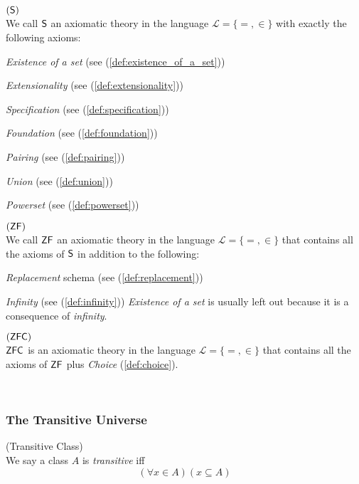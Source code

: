 \begin{definition}{$(\sf{S})$}\label{def:s}\\ %
We call $\sf{S}$ an axiomatic theory in the language $\mathscr{L} = \{=, \in\}$ with exactly the following axioms:
\bce[(i)]
\item \emph{Existence of a set} (see (\ref{def:existence_of_a_set}))
\item \emph{Extensionality} (see (\ref{def:extensionality}))
\item \emph{Specification} (see (\ref{def:specification}))
\item \emph{Foundation} (see (\ref{def:foundation}))
\item \emph{Pairing} (see (\ref{def:pairing}))
\item \emph{Union} (see (\ref{def:union}))
\item \emph{Powerset} (see (\ref{def:powerset}))
\ece
\end{definition}

\begin{definition}{$(\sf{ZF})$}\label{def:zf}\\ %
We call $\sf{ZF}$ an axiomatic theory in the language $\mathscr{L} = \{=, \in\}$ that contains all the axioms of $\sf{S}$ in addition to the following:
\bce[(i)]
\item \emph{Replacement} schema (see (\ref{def:replacement}))
\item \emph{Infinity} (see (\ref{def:infinity}))
\ece
\emph{Existence of a set} is usually left out because it is a consequence of \emph{infinity}.
\end{definition}

\begin{definition}{$(\sf{ZFC})$}\label{def:zfc}\\ %
$\sf{ZFC}$ is an axiomatic theory in the language $\mathscr{L} = \{=, \in\}$ that contains all the axioms of $\sf{ZF}$ plus \emph{Choice} (\ref{def:choice}).
\end{definition}

\

\subsubsection{The Transitive Universe}
\begin{definition}{(Transitive Class)}\label{def:transitivity}\\ %
We say a class $A$ is \emph{transitive} iff
\begin{equation}
(\forall x \in A)(x \subseteq A)
\end{equation}
\end{definition}

